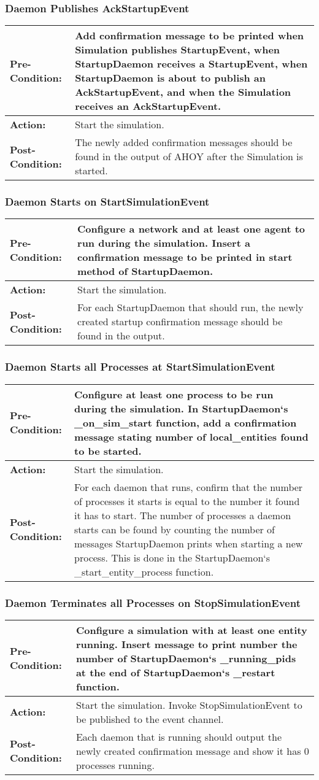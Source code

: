 \documentclass[titlepage]{article}
\newcommand{\testcase}[3]{
    \begin{center}
    \begin{tabular}{| l | p{0.7\textwidth}|}
        \hline
        \rowcolor[gray]{0.8}\textbf{Pre-Condition:} & #1 \\ \hline
        \textbf{Action:} & #2 \\ \hline
        \rowcolor[gray]{0.8}\textbf{Post-Condition:} & #3 \\ \hline
    \end{tabular}
    \end{center}
}
\begin{document}
\subsubsection{Daemon Publishes AckStartupEvent}
\testcase{Add confirmation message to be printed when Simulation publishes StartupEvent, when StartupDaemon receives a StartupEvent, when StartupDaemon is about to publish an AckStartupEvent, and when the Simulation receives an AckStartupEvent.}{Start the simulation.}{The newly added confirmation messages should be found in the output of AHOY after the Simulation is started.}

\subsubsection{Daemon Starts on StartSimulationEvent}
\testcase{Configure a network and at least one agent to run during the simulation.  Insert a confirmation message to be printed in start method of StartupDaemon.}{Start the simulation.}{For each StartupDaemon that should run, the newly created startup confirmation message should be found in the output.}

\subsubsection{Daemon Starts all Processes at StartSimulationEvent}
\testcase{Configure at least one process to be run during the simulation.  In StartupDaemon`s _on_sim_start function, add a confirmation message stating number of local_entities found to be started.}{Start the simulation.}{For each daemon that runs, confirm that the number of processes it starts is equal to the number it found it has to start.  The number of processes a daemon starts can be found by counting the number of messages StartupDaemon prints when starting a new process.  This is done in the StartupDaemon`s _start_entity_process function.}

\subsubsection{Daemon Terminates all Processes on StopSimulationEvent}
\testcase{Configure a simulation with at least one entity running.  Insert message to print number the number of StartupDaemon`s _running_pids at the end of StartupDaemon`s _restart function.}{Start the simulation. Invoke StopSimulationEvent to be published to the event channel.}{Each daemon that is running should output the newly created confirmation message and show it has 0 processes running.}
\end{document}
